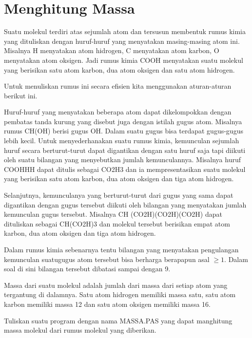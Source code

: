 \documentclass[a4paper,10pt,makeidx]{article}
\begin{document}
\section{Menghitung Massa}
\par
\indent
\indent
Suatu molekul terdiri atas sejumlah atom dan tersusun membentuk rumus kimia yang
dituliskan dengan huruf-huruf yang menyatakan masing-masing atom ini. Misalnya
H menyatakan atom hidrogen, C menyatakan atom karbon, O menyatakan atom
oksigen. Jadi rumus kimia COOH menyatakan suatu molekul yang berisikan satu
atom karbon, dua atom oksigen dan satu atom hidrogen.
\par
\indent
\indent
Untuk menuliskan rumus ini secara efisien  kita menggunakan aturan-aturan
berikut ini.
\par
\indent
\indent
Huruf-huruf yang menyatakan beberapa atom dapat dikelompokkan dengan pembatas
tanda kurung yang disebut juga dengan istilah gugus atom. Misalnya rumus CH(OH)
berisi gugus OH. Dalam suatu gugus bisa terdapat gugus-gugus lebih kecil. Untuk
menyederhanakan suatu rumus kimia, kemunculan sejumlah huruf secara
berturut-turut dapat digantikan dengan satu huruf saja tapi diikuti oleh suatu
bilangan yang menyebutkan jumlah kemunculannya. Misalnya huruf COOHHH dapat
ditulis sebagai CO2H3 dan ia mempresentasikan suatu molekul yang berisikan
satu atom karbon, dua atom oksigen dan tiga atom hidrogen.
\par
\indent
\indent
Selanjutnya, kemunculanya yang berturut-turut dari gugus yang sama  dapat
digantikan  dengan gugus tersebut diikuti oleh bilangan yang menyatakan jumlah
kemunculan gugus tersebut. Misalnya CH (CO2H)(CO2H)(CO2H) dapat dituliskan
sebagai CH(CO2H)3 dan molekul tersebut berisikan empat atom karbon, dua atom
oksigen dan tiga atom hidrogen.
\par
\indent
\indent
Dalam rumus kimia sebenarnya tentu bilangan yang menyatakan pengulangan
kemunculan  suatu\/gugus  atom tersebut bisa berharga berapapun asal $\ge 1$.
Dalam soal di sini bilangan tersebut  dibatasi sampai dengan 9.
\par
\indent
\indent
Massa dari suatu molekul adalah jumlah dari massa  dari setiap atom yang
tergantung di dalamnya. Satu atom hidrogen memiliki massa satu, satu atom
karbon memiliki  massa 12 dan satu atom oksigen memiliki  massa 16.
\par
\indent
\indent
Tuliskan suatu program  dengan nama MASSA.PAS yang dapat  manghitung massa
molekul dari rumus molekul yang diberikan.
\par
\indent
\indent
\end{document}
